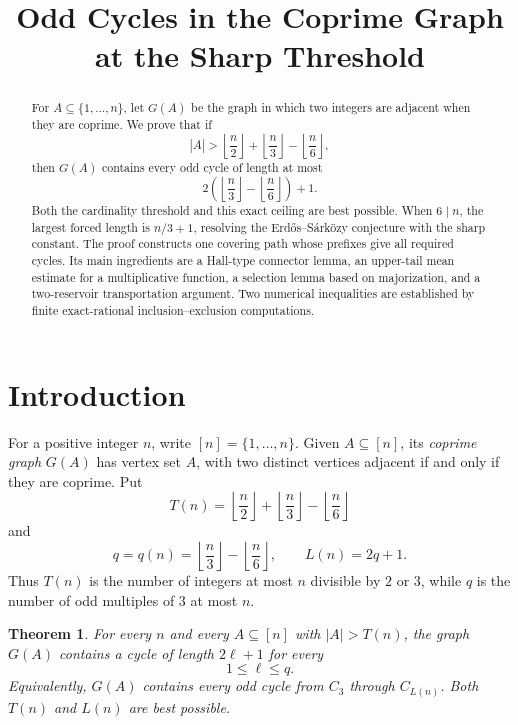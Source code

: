 \documentclass{article}
\title{Odd Cycles in the Coprime Graph at the Sharp Threshold}
\author{}
\date{}
\newtheorem{theorem}{Theorem}[section]
\theoremstyle{remark}
\begin{document}
\maketitle

\begin{abstract}
For \(A\subseteq\{1,\ldots,n\}\), let \(G(A)\) be the graph in which two
integers are adjacent when they are coprime. We prove that if
\[
 |A|>
 \left\lfloor\frac n2\right\rfloor+
 \left\lfloor\frac n3\right\rfloor-
 \left\lfloor\frac n6\right\rfloor,
\]
then \(G(A)\) contains every odd cycle of length at most
\[
2\left(
 \left\lfloor\frac n3\right\rfloor-
 \left\lfloor\frac n6\right\rfloor
\right)+1.
\]
Both the cardinality threshold and this exact ceiling are best possible.
When \(6\mid n\), the largest forced length is \(n/3+1\), resolving the
Erdős--Sárközy conjecture with the sharp constant. The proof constructs
one covering path whose prefixes give all required cycles. Its main
ingredients are a Hall-type connector lemma, an upper-tail mean estimate
for a multiplicative function, a selection lemma based on majorization,
and a two-reservoir transportation argument. Two numerical inequalities
are established by finite exact-rational inclusion--exclusion
computations.
\end{abstract}

\section{Introduction}

For a positive integer \(n\), write \([n]=\{1,\ldots,n\}\). Given
\(A\subseteq[n]\), its \emph{coprime graph} \(G(A)\) has vertex set \(A\),
with two distinct vertices adjacent if and only if they are coprime. Put
\[
 T(n)=
 \left\lfloor\frac n2\right\rfloor+
 \left\lfloor\frac n3\right\rfloor-
 \left\lfloor\frac n6\right\rfloor
\]
and
\[
 q=q(n)=
 \left\lfloor\frac n3\right\rfloor-
 \left\lfloor\frac n6\right\rfloor,
 \qquad
 L(n)=2q+1.
\]
Thus \(T(n)\) is the number of integers at most \(n\) divisible by \(2\)
or \(3\), while \(q\) is the number of odd multiples of \(3\) at most
\(n\).

\begin{theorem}\label{thm:main}
For every \(n\) and every \(A\subseteq[n]\) with \(|A|>T(n)\), the graph
\(G(A)\) contains a cycle of length \(2\ell+1\) for every
\[
 1\leq \ell\leq q.
\]
Equivalently, \(G(A)\) contains every odd cycle from \(C_3\) through
\(C_{L(n)}\). Both \(T(n)\) and \(L(n)\) are best possible.
\end{theorem}
\end{document}
